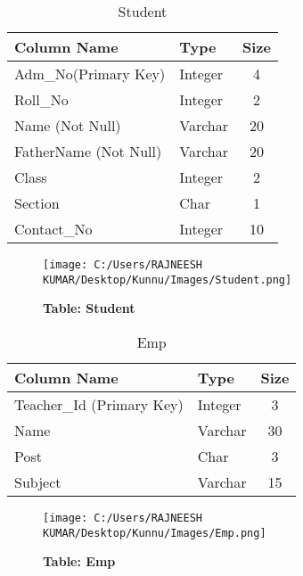 \vspace{6 pt}

\begin{table}[h!]
	\begin{center}
		\caption{Student}
			\begin{tabular}{| l | l | c |}
				\hline
				Column Name & Type & Size \\
				\hline
				Adm\_No(Primary Key) & Integer & 4 \\
				Roll\_No & Integer & 2 \\
				Name (Not Null) & Varchar & 20 \\
				FatherName (Not Null) & Varchar & 20 \\
				Class & Integer & 2 \\
				Section & Char & 1 \\
				Contact\_No & Integer & 10 \\
				\hline
			\end{tabular}
		\end{center}
	\end{table}		

\begin{figure}[H]
  \centering
    \texttt{[image: C:/Users/RAJNEESH KUMAR/Desktop/Kunnu/Images/Student.png]}
    \caption{\textbf{Table: Student}}
\end{figure}
	

\begin{table}[h!]
	\begin{center}
		\caption{Emp}
			\begin{tabular}{| l | l | c |}
				\hline
				Column Name & Type & Size \\
				\hline
				Teacher\_Id (Primary Key)	 & Integer & 3 \\
				Name	& Varchar & 30 \\
				Post & Char & 3 \\
				Subject & Varchar & 15 \\
				\hline
			\end{tabular}
		\end{center}
	\end{table}
	
\begin{figure}[H]
  \centering
    \texttt{[image: C:/Users/RAJNEESH KUMAR/Desktop/Kunnu/Images/Emp.png]}
    \caption{\textbf{Table: Emp}}
\end{figure}
	
